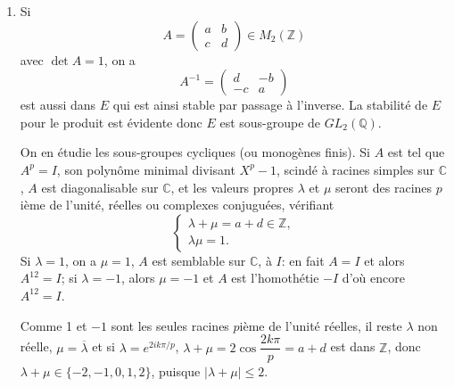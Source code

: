 \begin{enumerate}[label=\arabic*.,leftmargin=2.2em,itemsep=1.1em]
Sur $\mathbb R$, comme $\lambda_2<0$, il n'y a pas de solution.

Sur $\mathbb C$, en notant $P$ la matrice de passage de la base canonique à une base de vecteurs propres on trouvera 4 solutions
\[
X=P\begin{pmatrix}
0&0&0\\
0&\varepsilon_1\sqrt{\lambda_1}&0\\
0&0&i\varepsilon_2\sqrt{-\lambda_2}
\end{pmatrix}P^{-1}
\]
avec $\varepsilon_1\in\{-1,1\}$ et $\varepsilon_2\in\{-1,1\}$.

\item Si
\[
A=\begin{pmatrix}a&b\\c&d\end{pmatrix}\in M_2(\mathbb Z)
\]
avec $\det A=1$, on a
\[
A^{-1}=\begin{pmatrix}d&-b\\-c&a\end{pmatrix}
\]
est aussi dans $E$ qui est ainsi stable par passage à l'inverse. La stabilité de $E$ pour le produit est évidente donc $E$ est sous-groupe de $GL_2(\mathbb Q)$.

On en étudie les sous-groupes cycliques (ou monogènes finis).
Si $A$ est tel que $A^p=I$, son polynôme minimal divisant $X^p-1$, scindé à racines simples sur $\mathbb C$, $A$ est diagonalisable sur $\mathbb C$, et les valeurs propres $\lambda$ et $\mu$ seront des racines $p$ième de l'unité, réelles ou complexes conjuguées, vérifiant
\[
\begin{cases}
\lambda+\mu=a+d\in\mathbb Z,\\
\lambda\mu=1.
\end{cases}
\]
Si $\lambda=1$, on a $\mu=1$, $A$ est semblable sur $\mathbb C$, à $I$: en fait $A=I$ et alors $A^{12}=I$; si $\lambda=-1$, alors $\mu=-1$ et $A$ est l'homothétie $-I$ d'où encore $A^{12}=I$.

Comme 1 et $-1$ sont les seules racines $p$ième de l'unité réelles, il reste $\lambda$ non réelle, $\mu=\overline\lambda$ et si $\lambda=e^{2ik\pi/p}$, $\lambda+\mu=2\cos\dfrac{2k\pi}{p}=a+d$ est dans $\mathbb Z$, donc $\lambda+\mu\in\{-2,-1,0,1,2\}$, puisque $|\lambda+\mu|\le2$.


\end{enumerate}
